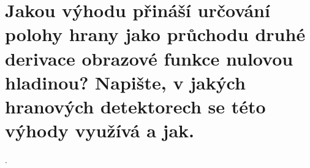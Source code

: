 \section{Jakou výhodu přináší určování polohy hrany jako průchodu druhé derivace obrazové funkce nulovou hladinou? 
Napište, v jakých hranových detektorech se této výhody využívá a jak.}.
